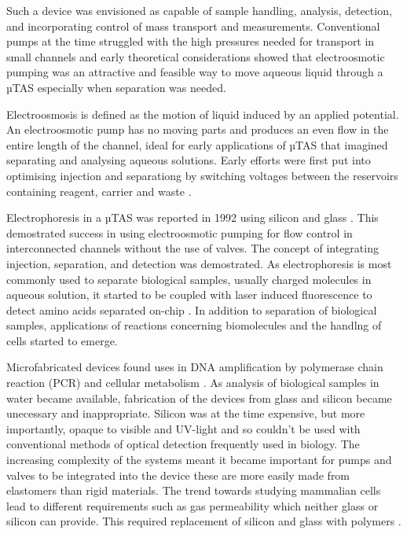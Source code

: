 Such a device was envisioned as capable of sample handling, analysis, detection, and incorporating control of
mass transport and measurements. Conventional pumps at the time struggled with the high pressures needed for transport
in small channels and early theoretical considerations showed that electroosmotic pumping was an attractive and
feasible way to move aqueous liquid through a µTAS especially when separation was needed.

Electroosmosis is defined as the motion of liquid induced by an applied potential. An electroosmotic pump
has no moving parts and produces an even flow in the entire length of the channel, ideal for early applications
of µTAS that imagined separating and analysing aqueous solutions. Early efforts were first put into optimising
injection and separationg by switching voltages between the reservoirs containing reagent, carrier and
waste \citep{manz1991integrated}.

Electrophoresis in a µTAS was reported in 1992 using silicon and glass \citep{harrison1992capillary}. This
demostrated success in using electroosmotic pumping for flow control in interconnected channels without the
use of valves. The concept of integrating injection, separation, and detection was demostrated. As electrophoresis
is most commonly used to separate biological samples, usually charged molecules in aqueous solution, it started to be
coupled with laser induced fluorescence to detect amino acids separated on-chip \citep{seiler1993planar}. In
addition to separation of biological samples, applications of reactions concerning biomolecules and the
handlng of cells started to emerge.

Microfabricated devices found uses in DNA amplification by polymerase chain reaction
(PCR) \citep{woolley1996functional} and cellular metabolism \citep{bousse1994micromachined}.
As analysis of biological samples in water became available, fabrication of the devices
from glass and silicon became unecessary and inappropriate. Silicon was at the time expensive, but more
importantly, opaque to visible and UV-light and so couldn't be used with conventional methods of optical
detection frequently used in biology. The increasing complexity of the systems meant it became
important for pumps and valves to be integrated into the device these are more easily made from elastomers
than rigid materials. The trend towards studying mammalian cells lead to different requirements such as gas
permeability which neither glass or silicon can provide. This required replacement of silicon and glass with
polymers \citep{RN5}.

